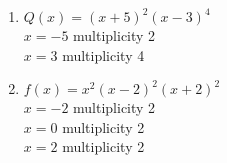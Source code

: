 \documentclass{ximera}
\begin{document}
\begin{enumerate}
\setcounter{enumi}{\value{HW}}


\item $Q(x) = (x + 5)^{2}(x - 3)^{4}$\\
$x = -5$ multiplicity 2\\
$x = 3$ multiplicity 4\\

%

\vfill


\item $f(x) = x^2(x-2)^2(x+2)^2$\\
$x = -2$ multiplicity 2\\
$x = 0$ multiplicity 2\\
$x = 2$ multiplicity 2\\

%

\setcounter{HW}{\value{enumi}}
\end{enumerate}
\end{document}
